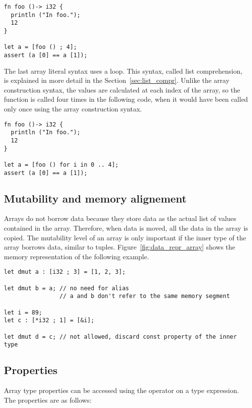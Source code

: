 \begin{lstlisting}[style=coloredverbatim]
fn foo ()-> i32 {
  println ("In foo.");
  12
}

let a = [foo () ; 4];
assert (a [0] == a [1]);
\end{lstlisting}

\smallskip
The last array literal syntax uses a  loop. This syntax, called list
comprehension, is explained in more detail in the Section~\ref{sec:list_compr}.
Unlike the array construction syntax, the values are calculated at each index of
the array, so the function is called four times in the following code, when it
would have been called only once using the array construction syntax.

\begin{lstlisting}[style=coloredverbatim]
fn foo ()-> i32 {
  println ("In foo.");
  12
}

let a = [foo () for i in 0 .. 4];
assert (a [0] == a [1]);
\end{lstlisting}


\subsection {Mutability and memory alignement}
Arrays do not borrow data because they store data as the actual list of values
contained in the array. Therefore, when data is moved, all the data in the array
is copied. The mutability level of an array is only important if the inner type
of the array borrows data, similar to tuples. Figure~\ref{fig:data_repr_array}
shows the memory representation of the following example.

\begin{lstlisting}[style=coloredverbatim]
let dmut a : [i32 ; 3] = [1, 2, 3];

let dmut b = a; // no need for alias
                // a and b don't refer to the same memory segment

let i = 89;
let c : [*i32 ; 1] = [&i];

let dmut d = c; // not allowed, discard const property of the inner type
\end{lstlisting}



\subsection {Properties}

Array type properties can be accessed using the \token{::} operator on a type
expression. The properties are as follows:


